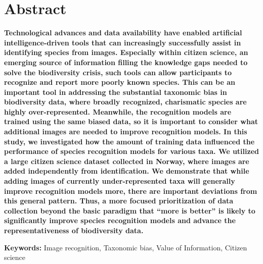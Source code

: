 \documentclass{article}
\begin{document}
\section*{Abstract}
\textbf{Technological advances and data availability have enabled artificial intelligence-driven tools that can increasingly successfully assist in identifying species from images. Especially within citizen science, an emerging source of information filling the knowledge gaps needed to solve the biodiversity crisis, such tools can allow participants to recognize and report more poorly known species. This can be an important tool in addressing the substantial taxonomic bias in biodiversity data, where broadly recognized, charismatic species are highly over-represented. Meanwhile, the recognition models are trained using the same biased data, so it is important to consider what additional images are needed to improve recognition models. In this study, we investigated how the amount of training data influenced the performance of species recognition models for various taxa. We utilized a large citizen science dataset collected in Norway, where images are added independently from identification. We demonstrate that while adding images of currently under-represented taxa will generally improve recognition models more, there are important deviations from this general pattern. Thus, a more focused prioritization of data collection beyond the basic paradigm that ``more is better'' is likely to significantly improve species recognition models and advance the representativeness of biodiversity data.}

\vspace{.5cm}
\noindent\textbf{Keywords:} Image recognition, Taxonomic bias, Value of Information, Citizen science
\end{document}
